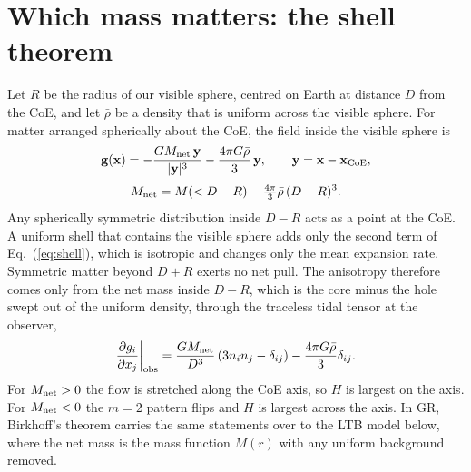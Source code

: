 \documentclass[10pt,twocolumn,letterpaper]{article}
\begin{document}
\section{Which mass matters: the shell theorem}
Let $R$ be the radius of our visible sphere, centred on Earth at distance $D$ from the CoE, and let $\bar\rho$ be a density that is uniform across the visible sphere. For matter arranged spherically about the CoE, the field inside the visible sphere is
\begin{equation}\label{eq:shell}
\mathbf g(\mathbf x)=-\frac{GM_{\rm net}\,\mathbf y}{|\mathbf y|^{3}}-\frac{4\pi G\bar\rho}{3}\,\mathbf y,\qquad \mathbf y=\mathbf x-\mathbf x_{\rm CoE},
\end{equation}
\begin{equation}\label{eq:mnet}
M_{\rm net}=M(<D-R)-\tfrac{4\pi}{3}\bar\rho\,(D-R)^3 .
\end{equation}
Any spherically symmetric distribution inside $D-R$ acts as a point at the CoE. A uniform shell that contains the visible sphere adds only the second term of Eq.~(\ref{eq:shell}), which is isotropic and changes only the mean expansion rate. Symmetric matter beyond $D+R$ exerts no net pull. The anisotropy therefore comes only from the net mass inside $D-R$, which is the core minus the hole swept out of the uniform density, through the traceless tidal tensor at the observer,
\begin{equation}\label{eq:tide}
\frac{\partial g_i}{\partial x_j}\bigg|_{\rm obs}=\frac{GM_{\rm net}}{D^3}\left(3n_in_j-\delta_{ij}\right)-\frac{4\pi G\bar\rho}{3}\delta_{ij}.
\end{equation}
For $M_{\rm net}>0$ the flow is stretched along the CoE axis, so $H$ is largest on the axis. For $M_{\rm net}<0$ the $m=2$ pattern flips and $H$ is largest across the axis. In GR, Birkhoff's theorem carries the same statements over to the LTB model below, where the net mass is the mass function $M(r)$ with any uniform background removed.
\end{document}
